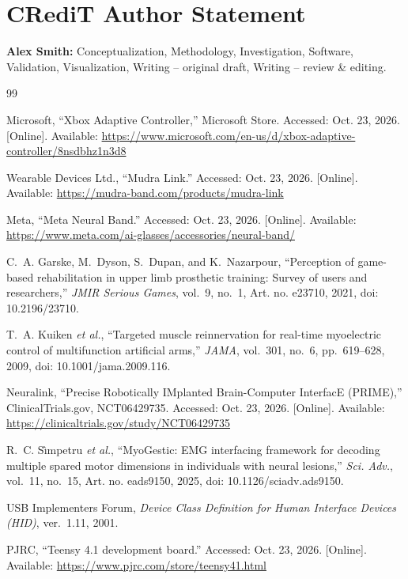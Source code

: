 \documentclass[conference]{IEEEtran}
\begin{document}
\section*{CRediT Author Statement}

\textbf{Alex Smith:} Conceptualization, Methodology, Investigation, Software, Validation, Visualization, Writing -- original draft, Writing -- review \& editing.

\begin{thebibliography}{99}

Microsoft, ``Xbox Adaptive Controller,'' Microsoft Store. Accessed: Oct. 23, 2026. [Online]. Available: \url{https://www.microsoft.com/en-us/d/xbox-adaptive-controller/8nsdbhz1n3d8}

Wearable Devices Ltd., ``Mudra Link.'' Accessed: Oct. 23, 2026. [Online]. Available: \url{https://mudra-band.com/products/mudra-link}

Meta, ``Meta Neural Band.'' Accessed: Oct. 23, 2026. [Online]. Available: \url{https://www.meta.com/ai-glasses/accessories/neural-band/}

C.~A. Garske, M.~Dyson, S.~Dupan, and K.~Nazarpour, ``Perception of game-based rehabilitation in upper limb prosthetic training: Survey of users and researchers,'' \textit{JMIR Serious Games}, vol.~9, no.~1, Art. no. e23710, 2021, doi: 10.2196/23710.

T.~A. Kuiken \textit{et al.}, ``Targeted muscle reinnervation for real-time myoelectric control of multifunction artificial arms,'' \textit{JAMA}, vol.~301, no.~6, pp.~619--628, 2009, doi: 10.1001/jama.2009.116.

Neuralink, ``Precise Robotically IMplanted Brain-Computer InterfacE (PRIME),'' ClinicalTrials.gov, NCT06429735. Accessed: Oct. 23, 2026. [Online]. Available: \url{https://clinicaltrials.gov/study/NCT06429735}

R.~C. S\^{\i}mpetru \textit{et al.}, ``MyoGestic: EMG interfacing framework for decoding multiple spared motor dimensions in individuals with neural lesions,'' \textit{Sci. Adv.}, vol.~11, no.~15, Art. no. eads9150, 2025, doi: 10.1126/sciadv.ads9150.

USB Implementers Forum, \textit{Device Class Definition for Human Interface Devices (HID)}, ver.~1.11, 2001.

PJRC, ``Teensy 4.1 development board.'' Accessed: Oct. 23, 2026. [Online]. Available: \url{https://www.pjrc.com/store/teensy41.html}


\end{thebibliography}
\end{document}
